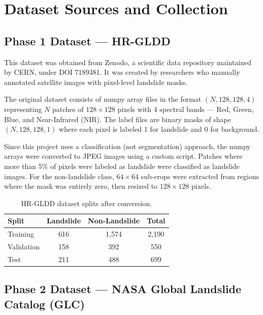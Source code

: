 \documentclass[11pt]{article}
\begin{document}
\section{Dataset Sources and Collection}

\subsection{Phase 1 Dataset --- HR-GLDD}

This dataset was obtained from Zenodo, a scientific data repository maintained by CERN, under DOI 7189381. It was created by researchers who manually annotated satellite images with pixel-level landslide masks.

The original dataset consists of numpy array files in the format $(N, 128, 128, 4)$ representing $N$ patches of $128 \times 128$ pixels with 4 spectral bands --- Red, Green, Blue, and Near-Infrared (NIR). The label files are binary masks of shape $(N, 128, 128, 1)$ where each pixel is labeled 1 for landslide and 0 for background.

Since this project uses a classification (not segmentation) approach, the numpy arrays were converted to JPEG images using a custom script. Patches where more than 5\% of pixels were labeled as landslide were classified as landslide images. For the non-landslide class, $64 \times 64$ sub-crops were extracted from regions where the mask was entirely zero, then resized to $128 \times 128$ pixels.

\begin{table}[H]
    \centering
    \begin{tabular}{lccc}
        \toprule
        \textbf{Split} & \textbf{Landslide} & \textbf{Non-Landslide} & \textbf{Total} \\
        \midrule
        Training   & 616   & 1,574 & 2,190 \\
        Validation & 158   & 392   & 550 \\
        Test       & 211   & 488   & 699 \\
        \bottomrule
    \end{tabular}
    \caption{HR-GLDD dataset splits after conversion.}
\end{table}

\subsection{Phase 2 Dataset --- NASA Global Landslide Catalog (GLC)}
\end{document}
